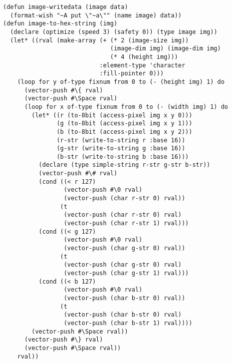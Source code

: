 \documentclass[11pt]{report}
\begin{document}
\begin{lstlisting}
(defun image-writedata (image data)
  (format-wish "~A put \"~a\"" (name image) data))
(defun image-to-hex-string (img)
  (declare (optimize (speed 3) (safety 0)) (type image img))
  (let* ((rval (make-array (+ (* 2 (image-size img))
                              (image-dim img) (image-dim img)
                              (* 4 (height img)))
                           :element-type 'character
                           :fill-pointer 0)))
    (loop for y of-type fixnum from 0 to (- (height img) 1) do
      (vector-push #\{ rval)
      (vector-push #\Space rval) 
      (loop for x of-type fixnum from 0 to (- (width img) 1) do
        (let* ((r (to-8bit (access-pixel img x y 0)))
               (g (to-8bit (access-pixel img x y 1)))
               (b (to-8bit (access-pixel img x y 2)))
               (r-str (write-to-string r :base 16))
               (g-str (write-to-string g :base 16))
               (b-str (write-to-string b :base 16)))
          (declare (type simple-string r-str g-str b-str))
          (vector-push #\# rval)
          (cond ((< r 127)
                 (vector-push #\0 rval)
                 (vector-push (char r-str 0) rval))
                (t
                 (vector-push (char r-str 0) rval)
                 (vector-push (char r-str 1) rval)))
          (cond ((< g 127)
                 (vector-push #\0 rval)
                 (vector-push (char g-str 0) rval))
                (t
                 (vector-push (char g-str 0) rval)
                 (vector-push (char g-str 1) rval)))
          (cond ((< b 127)
                 (vector-push #\0 rval)
                 (vector-push (char b-str 0) rval))
                (t
                 (vector-push (char b-str 0) rval)
                 (vector-push (char b-str 1) rval))))
        (vector-push #\Space rval))
      (vector-push #\} rval)
      (vector-push #\Space rval))
    rval))

\end{lstlisting}
\end{document}
